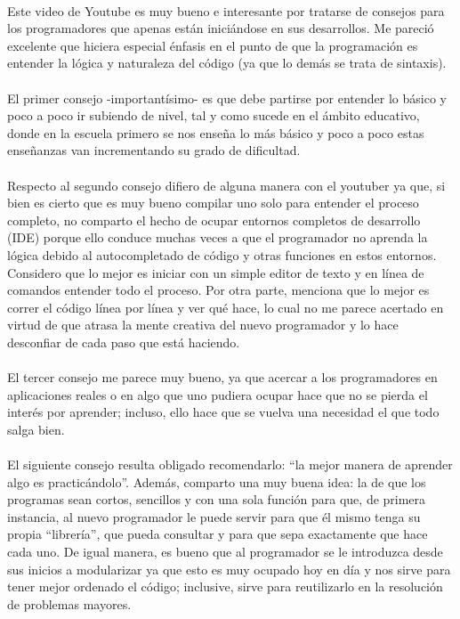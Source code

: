 \documentclass[letterpaper,12pt]{article} %
\begin{document}
    \\
	Este video de Youtube es muy bueno e interesante por tratarse de consejos para los programadores que apenas están iniciándose en sus desarrollos. Me pareció excelente que hiciera especial énfasis en el punto de que la programación es entender la lógica y naturaleza del código (ya que lo demás se trata de sintaxis).\\ \\
	El primer consejo -importantísimo- es que debe partirse por entender lo básico y poco a poco ir subiendo de nivel, tal y como sucede en el ámbito educativo, donde en la escuela primero se nos enseña lo más básico y poco a poco estas enseñanzas van incrementando su grado de dificultad. \\ \\
	Respecto al segundo consejo difiero de alguna manera con el youtuber ya que, si bien es cierto que es muy bueno compilar uno solo para entender el proceso completo, no comparto el hecho de ocupar entornos completos de desarrollo (IDE) porque ello conduce muchas veces a que el programador no aprenda la lógica debido al autocompletado de código y otras funciones en estos entornos. Considero que lo mejor es iniciar con un simple editor de texto y en línea de comandos entender todo el proceso. Por otra parte, menciona que lo mejor es correr el código línea por línea y ver qué hace, lo cual no me parece acertado en virtud de que atrasa la mente creativa del nuevo programador y lo hace desconfiar de cada paso que está haciendo. \\ \\
	El tercer consejo me parece muy bueno, ya que acercar a los programadores en aplicaciones reales o en algo que uno pudiera ocupar hace que no se pierda el interés por aprender; incluso, ello hace que se vuelva una necesidad el que todo salga bien. \\ \\
	El siguiente consejo resulta obligado recomendarlo: “la mejor manera de aprender algo es practicándolo”. Además, comparto una muy buena idea: la de que los programas sean cortos, sencillos y con una sola función para que, de primera instancia, al nuevo programador le puede servir para que él mismo tenga su propia “librería”, que pueda consultar y para que sepa exactamente que hace cada uno. De igual manera, es bueno que al programador se le introduzca desde sus inicios a modularizar ya que esto es muy ocupado hoy en día y nos sirve para tener mejor ordenado el código; inclusive, sirve para reutilizarlo en la resolución de problemas mayores.\\ \\
\end{document}
